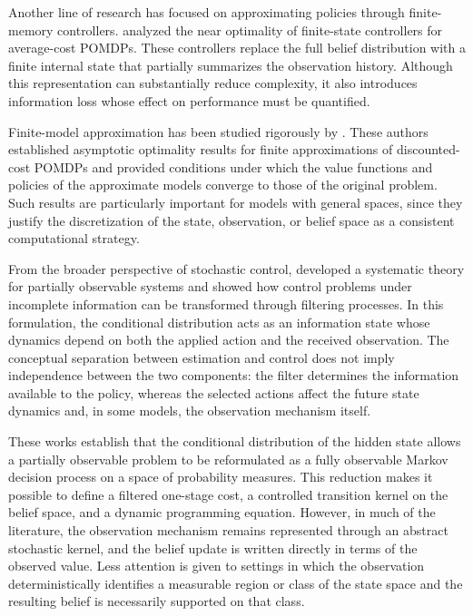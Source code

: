 \documentclass[10pt,twocolumn]{article}
\theoremstyle{remark}
\begin{document}
Another line of research has focused on approximating policies through finite-memory controllers. \citet{YuBertsekas2008FiniteStateControllers} analyzed the near optimality of finite-state controllers for average-cost POMDPs. These controllers replace the full belief distribution with a finite internal state that partially summarizes the observation history. Although this representation can substantially reduce complexity, it also introduces information loss whose effect on performance must be quantified.

Finite-model approximation has been studied rigorously by \citet{SaldiYukselLinder2020FinitePOMDPApproximation}. These authors established asymptotic optimality results for finite approximations of discounted-cost POMDPs and provided conditions under which the value functions and policies of the approximate models converge to those of the original problem. Such results are particularly important for models with general spaces, since they justify the discretization of the state, observation, or belief space as a consistent computational strategy.

From the broader perspective of stochastic control, \citet{Bensoussan1992PartiallyObservableControl} developed a systematic theory for partially observable systems and showed how control problems under incomplete information can be transformed through filtering processes. In this formulation, the conditional distribution acts as an information state whose dynamics depend on both the applied action and the received observation. The conceptual separation between estimation and control does not imply independence between the two components: the filter determines the information available to the policy, whereas the selected actions affect the future state dynamics and, in some models, the observation mechanism itself.

These works establish that the conditional distribution of the hidden state allows a partially observable problem to be reformulated as a fully observable Markov decision process on a space of probability measures. This reduction makes it possible to define a filtered one-stage cost, a controlled transition kernel on the belief space, and a dynamic programming equation. However, in much of the literature, the observation mechanism remains represented through an abstract stochastic kernel, and the belief update is written directly in terms of the observed value. Less attention is given to settings in which the observation deterministically identifies a measurable region or class of the state space and the resulting belief is necessarily supported on that class.
\end{document}
